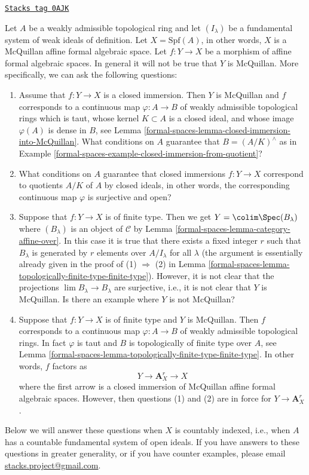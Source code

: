 \begin{remark}[Questions]
\label{formal-spaces-remark-questions}
\href{https://stacks.math.columbia.edu/tag/0AJK}{\texttt{Stacks tag 0AJK}}

Let $A$ be a weakly admissible topological ring and let $(I_\lambda)$
be a fundamental system of weak ideals of definition. Let $X = \text{Spf}(A)$,
in other words, $X$ is a McQuillan affine formal algebraic space.
Let $f : Y \to X$ be a morphism of affine formal algebraic spaces.
In general it will not be true that $Y$ is McQuillan. More specifically,
we can ask the following questions:
\begin{enumerate}
\item Assume that $f : Y \to X$ is a closed immersion. Then
$Y$ is McQuillan and $f$ corresponds to a continuous map
$\varphi : A \to B$ of weakly admissible topological rings
which is taut, whose kernel $K \subset A$ is a closed ideal, and
whose image $\varphi(A)$ is dense in $B$, see
Lemma \ref{formal-spaces-lemma-closed-immersion-into-McQuillan}.
What conditions on $A$ guarantee that $B = (A/K)^\wedge$ as in
Example \ref{formal-spaces-example-closed-immersion-from-quotient}?
\item What conditions on $A$ guarantee that closed immersions
$f : Y \to X$ correspond to quotients $A/K$ of $A$ by closed ideals,
in other words, the corresponding continuous map $\varphi$ is surjective
and open?
\item Suppose that $f : Y \to X$ is of finite type. Then we get
$Y = \colim \Spec(B_\lambda)$ where $(B_\lambda)$ is an object of
$\mathcal{C}$ by Lemma \ref{formal-spaces-lemma-category-affine-over}.
In this case it is true that there exists a fixed integer $r$ such
that $B_\lambda$ is generated by $r$ elements over $A/I_\lambda$ for
all $\lambda$ (the argument is essentially already given in the proof of
(1) $\Rightarrow$ (2) in
Lemma \ref{formal-spaces-lemma-topologically-finite-type-finite-type}).
However, it is not clear that the projections
$\lim B_\lambda \to B_\lambda$ are surjective, i.e.,
it is not clear that $Y$ is McQuillan.
Is there an example where $Y$ is not McQuillan?
\item Suppose that $f : Y \to X$ is of finite type and $Y$ is McQuillan.
Then $f$ corresponds to a continuous map $\varphi : A \to B$ of weakly
admissible topological rings. In fact $\varphi$ is taut and
$B$ is topologically of finite type over $A$, see
Lemma \ref{formal-spaces-lemma-topologically-finite-type-finite-type}.
In other words, $f$ factors as
$$
Y \longrightarrow \mathbf{A}^r_X \longrightarrow X
$$
where the first arrow is a closed immersion of McQuillan affine
formal algebraic spaces. However, then questions (1) and
(2) are in force for $Y \to \mathbf{A}^r_X$.
\end{enumerate}
Below we will answer these questions when
$X$ is countably indexed, i.e., when $A$ has a countable fundamental
system of open ideals. If you have answers to these questions
in greater generality, or if you have counter examples, please email
\href{mailto:stacks.project@gmail.com}{stacks.project@gmail.com}.
\end{remark}

